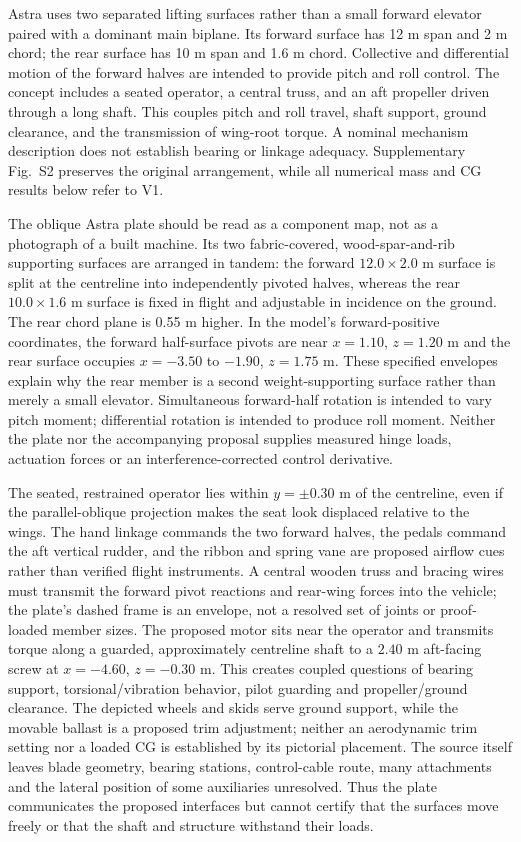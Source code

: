 \documentclass[10pt,letterpaper]{article}
\begin{document}
Astra uses two separated lifting surfaces rather than a small forward elevator paired with a dominant main biplane. Its forward surface has 12 m span and 2 m chord; the rear surface has 10 m span and 1.6 m chord. Collective and differential motion of the forward halves are intended to provide pitch and roll control. The concept includes a seated operator, a central truss, and an aft propeller driven through a long shaft. This couples pitch and roll travel, shaft support, ground clearance, and the transmission of wing-root torque. A nominal mechanism description does not establish bearing or linkage adequacy. Supplementary Fig.~S2 preserves the original arrangement, while all numerical mass and CG results below refer to V1.



The oblique Astra plate should be read as a component map, not as a photograph of a built machine. Its two fabric-covered, wood-spar-and-rib supporting surfaces are arranged in tandem: the forward $12.0\times2.0$ m surface is split at the centreline into independently pivoted halves, whereas the rear $10.0\times1.6$ m surface is fixed in flight and adjustable in incidence on the ground. The rear chord plane is 0.55 m higher. In the model's forward-positive coordinates, the forward half-surface pivots are near $x=1.10$, $z=1.20$ m and the rear surface occupies $x=-3.50$ to $-1.90$, $z=1.75$ m. These specified envelopes explain why the rear member is a second weight-supporting surface rather than merely a small elevator. Simultaneous forward-half rotation is intended to vary pitch moment; differential rotation is intended to produce roll moment. Neither the plate nor the accompanying proposal supplies measured hinge loads, actuation forces or an interference-corrected control derivative.

The seated, restrained operator lies within $y=\pm0.30$ m of the centreline, even if the parallel-oblique projection makes the seat look displaced relative to the wings. The hand linkage commands the two forward halves, the pedals command the aft vertical rudder, and the ribbon and spring vane are proposed airflow cues rather than verified flight instruments. A central wooden truss and bracing wires must transmit the forward pivot reactions and rear-wing forces into the vehicle; the plate's dashed frame is an envelope, not a resolved set of joints or proof-loaded member sizes. The proposed motor sits near the operator and transmits torque along a guarded, approximately centreline shaft to a $2.40$ m aft-facing screw at $x=-4.60$, $z=-0.30$ m. This creates coupled questions of bearing support, torsional/vibration behavior, pilot guarding and propeller/ground clearance. The depicted wheels and skids serve ground support, while the movable ballast is a proposed trim adjustment; neither an aerodynamic trim setting nor a loaded CG is established by its pictorial placement. The source itself leaves blade geometry, bearing stations, control-cable route, many attachments and the lateral position of some auxiliaries unresolved. Thus the plate communicates the proposed interfaces but cannot certify that the surfaces move freely or that the shaft and structure withstand their loads.
\end{document}
